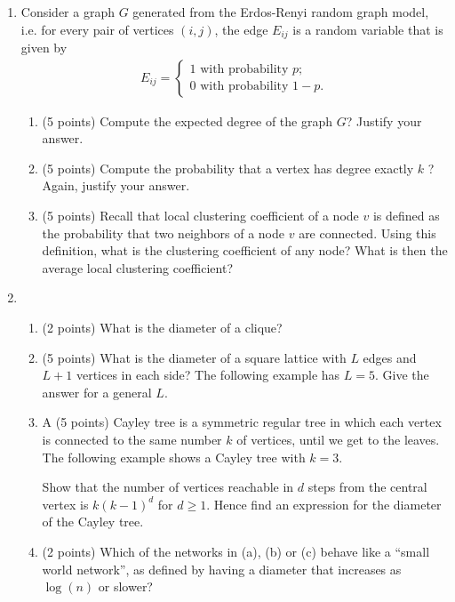 \documentclass[a4paper,10pt]{article}
\begin{document}
\begin{enumerate}
\item Consider a graph $G$ generated from the Erdos-Renyi random graph model, 
i.e. for every pair of vertices $(i, j)$, the 
edge $E_{ij}$ is a random variable that is given by 
\begin{align*}
  E_{ij} = \begin{cases}
           1 \mbox{ with probability } p;\\
           0 \mbox{ with probability } 1 - p.
            \end{cases}
\end{align*}
\begin{enumerate}
 \item (5 points) Compute the expected degree of the graph $G$? Justify your answer.
 \item (5 points) Compute the probability that a vertex has degree exactly $k$ ? Again, justify your answer. 
 \item (5 points) Recall that local clustering coefficient of a node $v$ is defined as the probability that two neighbors of a node $v$ are connected. 
 Using this definition, what is the clustering coefficient of any node? What is then the average local clustering coefficient?
\end{enumerate}





\item 
\begin{enumerate}
\item (2 points) What is the diameter of a clique?
\item (5 points) What is the diameter of a square lattice with $L$ edges and $L+1$ vertices in each side? The following example has $L=5$.
Give the answer for a general $L$.
\vspace*{2in}

\item A (5 points) Cayley tree is a symmetric regular tree in which each vertex is connected to the same number $k$ of vertices, 
until we get to the leaves. The following example shows a Cayley tree with $k = 3$. 
\vspace*{2in}

Show that the number of vertices reachable in $d$ steps from the central vertex is $k(k-1)^d$ for $d \ge 1$. 
Hence find an expression for the diameter of the Cayley tree. 

\item (2 points) Which of the networks in (a), (b) or (c) behave like a ``small world network'', as defined by having a diameter
that increases as $\log(n)$ or slower?
\end{enumerate}


\end{enumerate}
\end{document}
